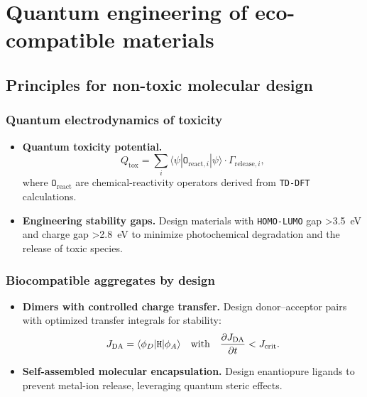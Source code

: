 \documentclass[12pt, a4paper]{article}
\begin{document}
\section{Quantum engineering of eco-compatible materials}

\subsection{Principles for non-toxic molecular design}

\subsubsection{Quantum electrodynamics of toxicity}

\begin{itemize}
    \item \textbf{Quantum toxicity potential.}
    \begin{equation}
    Q_{\text{tox}} = \sum_i \langle \psi | \mathtt{O}_{\text{react},i} | \psi \rangle \cdot \Gamma_{\text{release},i},
    \end{equation}
    where $\mathtt{O}_{\text{react}}$ are chemical-reactivity operators derived from \texttt{TD-DFT} calculations.
    
    \item \textbf{Engineering stability gaps.} Design materials with \texttt{HOMO-LUMO} gap \SI{>3.5}{\electronvolt} and charge gap \SI{>2.8}{\electronvolt} to minimize photochemical degradation and the release of toxic species.
\end{itemize}

\subsubsection{Biocompatible aggregates by design}

\begin{itemize}
    \item \textbf{Dimers with controlled charge transfer.} Design donor–acceptor pairs with optimized transfer integrals for stability:
    \begin{equation}
    J_{\text{DA}} = \langle \phi_D | \mathtt{H} | \phi_A \rangle \quad \text{with} \quad \pdv{J_{\text{DA}}}{t} < J_{\text{crit}}.
    \end{equation}
    
    \item \textbf{Self-assembled molecular encapsulation.} Design enantiopure ligands to prevent metal-ion release, leveraging quantum steric effects.
\end{itemize}
\end{document}
